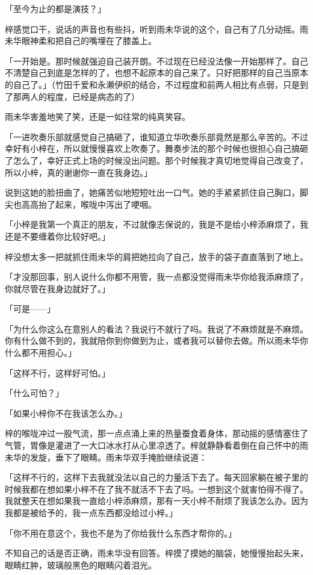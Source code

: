 \documentclass[UTF8]{ctexart}
\begin{document}
    「至今为止的都是演技？」

    梓感觉口干，说话的声音也有些抖，听到雨未华说的这个，自己有了几分动摇。雨未华眼神柔和把自己的嘴埋在了膝盖上。

    「一开始是。那时候就强迫自己装开朗。不过现在已经没法像一开始那样了。自己不清楚自己到底是怎样的了，也想不起原本的自己来了。只好把那样的自己当原本的自己了。」（竹田千爱和永濑伊织的结合，不过程度和前两人相比有点弱，只是到了那两人的程度，已经是病态的了）

    雨未华害羞地笑了笑，还是一如往常的纯真笑容。

    「一进吹奏乐部就感觉自己搞砸了，谁知道立华吹奏乐部竟然是那么辛苦的。不过幸好有小梓在，所以就慢慢喜欢上吹奏了。舞奏步法的那个时候也很担心自己搞砸了怎么了，幸好正式上场的时候没出问题。那个时候我才真切地觉得自己改变了，所以小梓，真的谢谢你一直在我身边。」

    说到这她的脸扭曲了，她痛苦似地短短吐出一口气。她的手紧紧抓住自己胸口，脚尖也高高抬了起来，喉咙中泻出了哽咽。

    「小梓是我第一个真正的朋友，不过就像志保说的，我是不是给小梓添麻烦了，我还是不要缠着你比较好吧。」

    梓没想太多一把就抓住雨未华的肩把她拉向了自己，放手的袋子直直落到了地上。

    「才没那回事，别人说什么你都不用管，我一点都没觉得雨未华你给我添麻烦了，你就尽管在我身边就好了。」

    「可是——」

    「为什么你这么在意别人的看法？我说行不就行了吗。我说了不麻烦就是不麻烦。你有什么做不到的，我就陪你到你做到为止，或者我可以替你去做。所以雨未华你什么都不用担心。」

    「这样不行，这样好可怕。」

    「什么可怕？」

    「如果小梓你不在我该怎么办。」

    梓的喉咙冲过一股气流，那一点点涌上来的热量蚕食着身体，那动摇的感情塞住了气管，胃像是灌进了一大口冰水打从心里凉透了。梓就静静看着倒在自己怀中的雨未华的发旋，垂下了眼睛。雨未华双手掩脸继续说道：

    「这样不行的，这样下去我就没法以自己的力量活下去了。每天回家躺在被子里的时候我都在想如果小梓不在了我不就活不下去了吗。一想到这个就害怕得不得了。我就整天在想如果我一直给小梓添麻烦，那有一天小梓不耐烦了我该怎么办。因为我都是被给予的，我一点东西都没给过小梓。」

    「你不用在意这个，我也不是为了你给我什么东西才帮你的。」

    不知自己的话是否正确，雨未华没有回答。梓摸了摸她的脑袋，她慢慢抬起头来，眼睛红肿，玻璃般黑色的眼睛闪着泪光。
\end{document}
